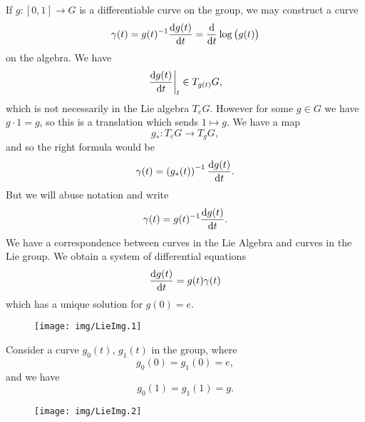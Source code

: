 If $g\colon[0,1]\to G$ is a differentiable curve on the group, we
may construct a curve
\begin{equation}
\gamma(t)=g(t)^{-1}\frac{\mathrm{d} g(t)}{\mathrm{d} t}=\frac{\mathrm{d}}{\mathrm{d} t}\log\big(g(t)\big)
\end{equation}
on the algebra. We have
\begin{equation}
\left.\frac{\mathrm{d} g(t)}{\mathrm{d} t}\right|_{t}\in T_{g(t)}G,
\end{equation}
which is not necessarily in the Lie algebra $T_{e}G$. However for
some $g\in G$ we have $g\cdot 1=g$, so this is a translation
which sends $1\mapsto g$. We have a map
\begin{equation}
g_{*}\colon T_{e}G\to T_{g}G,
\end{equation}
and so the right formula would be
\begin{equation}
\gamma(t)=\left(g_{*}(t)\right)^{-1}\frac{\mathrm{d} g(t)}{\mathrm{d} t}.
\end{equation}
But we will abuse notation and write
\begin{equation}
\gamma(t)=g(t)^{-1}\frac{\mathrm{d} g(t)}{\mathrm{d} t}.
\end{equation}
We have a correspondence between curves in the Lie Algebra and
curves in the Lie group. We obtain a system of differential
equations 
\begin{equation}
\frac{\mathrm{d} g(t)}{\mathrm{d} t}=g(t)\gamma(t)
\end{equation}
which has a unique solution for $g(0)=e$.

\begin{wrapfigure}[10]{r}{6.25cm}  
  \begin{center}
    \texttt{[image: img/LieImg.1]}
  \end{center}
  \vspace{-20pt}
\end{wrapfigure}

Consider a curve $g_{0}(t)$, $g_{1}(t)$ in the group, where
\begin{equation}
g_{0}(0)=g_{1}(0)=e,
\end{equation}
and we have
\begin{equation}
g_{0}(1)=g_{1}(1)=g.
\end{equation}
\begin{wrapfigure}[6]{l}{4cm}
  \vspace{-20pt}
  \begin{center}
    \texttt{[image: img/LieImg.2]}
  \end{center}
  \vspace{-20pt}
\end{wrapfigure}

